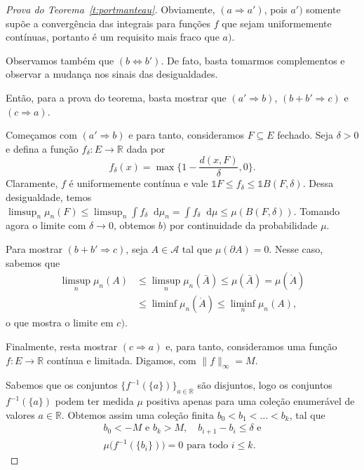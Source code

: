 \documentclass[reqno, draft]{book}
\newcommand*\1{\mathds{1}}
\renewcommand*\d{\mathop{}\!\mathrm{d}}
\begin{document}
\begin{proof}[Prova do Teorema~\ref{t:portmanteau}]
  Obviamente, $(a \Rightarrow a')$, pois $a')$ somente supõe a convergência das integrais para funções $f$ que sejam uniformemente contínuas, portanto é um requisito mais fraco que $a)$.

  Observamos também que $(b \Leftrightarrow b')$.
  De fato, basta tomarmos complementos e observar a mudança nos sinais das desigualdades.

  Então, para a prova do teorema, basta mostrar que $(a' \Rightarrow b)$, $(b + b' \Rightarrow c)$ e $(c \Rightarrow a)$.

  Começamos com $(a' \Rightarrow b)$ e para tanto, consideramos $F \subseteq E$ fechado.
  Seja $\delta > 0$ e defina a função $f_\delta: E \to \mathbb{R}$ dada por
  \begin{equation}
    f_\delta (x) = \max \Big\{ 1 - \frac{d(x, F)}{\delta}, 0 \Big\}.
  \end{equation}
  Claramente, $f$ é uniformemente contínua e vale $\1{F} \leq f_\delta \leq \1{B(F,\delta)}$.
  Dessa desigualdade, temos $\limsup_n \mu_n(F) \leq \limsup_n \int f_\delta \d \mu_n = \int f_\delta \d \mu \leq \mu(B(F,\delta))$.
  Tomando agora o limite com $\delta \to 0$, obtemos $b)$ por continuidade da probabilidade $\mu$.


  Para mostrar $(b + b' \Rightarrow c)$, seja $A \in \mathcal{A}$ tal que $\mu(\partial A) = 0$.
  Nesse caso, sabemos que
  \begin{equation*}
    \begin{split}
      \limsup_n \mu_n(A) & \leq \limsup_n \mu_n(\bar A) \leq \mu (\bar A) = \mu (\mathring{A})\\
      & \leq \liminf \mu_n (\mathring{A}) \leq \liminf_n \mu_n (A),
    \end{split}
  \end{equation*}
  o que mostra o limite em $c)$.

  Finalmente, resta mostrar $(c \Rightarrow a)$ e, para tanto, consideramos uma função $f: E \to \mathbb{R}$ contínua e limitada.
  Digamos, com $\lVert f \rVert_\infty = M$.

  Sabemos que os conjuntos $\{f^{-1}(\{a\})\}_{a \in \mathbb{R}}$ são disjuntos, logo os conjuntos $f^{-1}(\{a\})$ podem ter medida $\mu$ positiva apenas para uma coleção enumerável de valores $a \in \mathbb{R}$.
  Obtemos assim uma coleção finita $b_0 < b_1 < \dots < b_k$, tal que
  \begin{equation}
    \begin{array}{c}
      b_0 < -M \text{ e } b_k > M, \quad b_{i+1} - b_i \leq \delta \text{ e}\\
      \mu\big(f^{-1} (\{b_i\}) \big) = 0 \text{ para todo $i \leq k$}.
    \end{array}
  \end{equation}


\end{proof}
\end{document}
